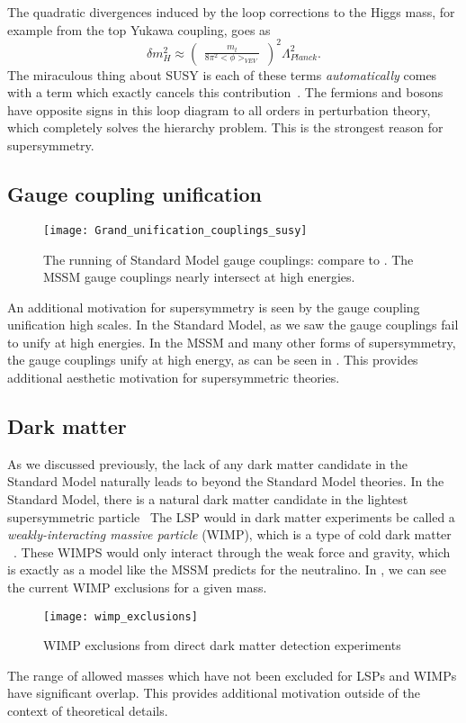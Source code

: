 The quadratic divergences induced by the loop corrections to the Higgs mass, for example from the top Yukawa coupling, goes as
\begin{equation}
\delta m^2_H \approx \begin{pmatrix} \frac{m_t}{8\pi^2 <\phi>_{VEV}} \end{pmatrix}^2 \Lambda_{Planck}^2.
\end{equation}
The miraculous thing about SUSY is each of these terms \textit{automatically} comes with a term which exactly cancels this contribution~\cite{susyPrimer}.
The fermions and bosons have opposite signs in this loop diagram to all orders in perturbation theory, which completely solves the hierarchy problem.
This is the strongest reason for supersymmetry.

\subsection{Gauge coupling unification}
\begin{figure}
\caption{The running of Standard Model gauge couplings: compare to .  The MSSM gauge couplings nearly intersect at high energies.}\label{fig:susy_gauge_coupling}
\texttt{[image: Grand\_unification\_couplings\_susy]}
\end{figure}

An additional motivation for supersymmetry is seen by the gauge coupling unification high scales.
In the Standard Model, as we saw the gauge couplings fail to unify at high energies.
In the MSSM and many other forms of supersymmetry, the gauge couplings unify at high energy, as can be seen in .
This provides additional aesthetic motivation for supersymmetric theories.

\subsection{Dark matter}

As we discussed previously, the lack of any dark matter candidate in the Standard Model naturally leads to beyond the Standard Model theories.
In the Standard Model, there is a natural dark matter candidate in the lightest supersymmetric particle~\cite{susyPrimer}
The LSP would in dark matter experiments be called a  \textit{weakly-interacting massive particle} (WIMP), which is a type of cold dark matter ~\cite{darkMatterPrimer,Klasen:2015uma}.
These WIMPS would only interact through the weak force and gravity, which is exactly as a model like the MSSM predicts for the neutralino.
In , we can see the current WIMP exclusions for a given mass.
\begin{figure}
\caption{WIMP exclusions from direct dark matter detection experiments}\label{fig:wimp_exclusions}
\texttt{[image: wimp\_exclusions]}
\end{figure}
The range of allowed masses which have not been excluded for LSPs and WIMPs have significant overlap.
This provides additional motivation outside of the context of theoretical details.

